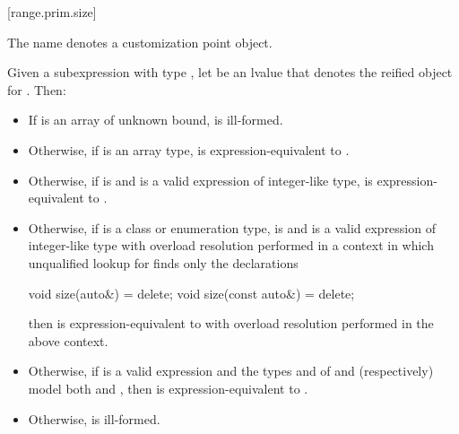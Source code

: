 [range.prim.size]{}
%

\pnum
The name  denotes a customization point
object.

\pnum
Given a subexpression  with type ,
let  be an lvalue that denotes the reified object for .
Then:
\begin{itemize}
\item
  If  is an array of unknown bound,
   is ill-formed.

\item
  Otherwise, if  is an array type,
   is expression-equivalent to
  .

\item
  Otherwise, if 
  is  and
  is a valid expression of integer-like type,
   is expression-equivalent to
  .

\item
  Otherwise, if  is a class or enumeration type,
   is  and
  is a valid expression of integer-like type
  with overload resolution performed in a context in which
  unqualified lookup for  finds only the declarations
\begin{codeblock}
void size(auto&) = delete;
void size(const auto&) = delete;
\end{codeblock}
  then  is expression-equivalent to
  with overload resolution performed in the above context.

\item
  Otherwise, if
  is a valid expression and
  the types  and  of  and
   (respectively) model both
   and
  ,
  then  is expres\-sion-equivalent to
  .

\item
  Otherwise,  is ill-formed.
\end{itemize}


